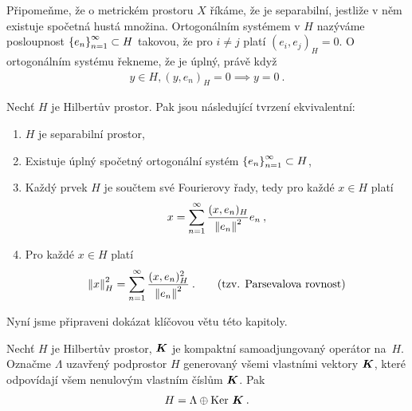 Připomeňme, že o metrickém prostoru $X$ říkáme, že je separabilní, jestliže v něm existuje spočetná hustá množina. Ortogonálním systémem v $H$ nazýváme posloupnost $\left \lbrace e_n \right \rbrace_{n=1}^\infty \subset H$ takovou, že pro $i\neq j$ platí $(e_i,e_j)_H =0$. O ortogonálním systému řekneme, že je úplný, právě když \begin{align*}
    y \in H, (y,e_n)_H =0 \implies y = 0 \:.
\end{align*}

\begin{theorem} \label{4.fourier}
Nechť $H$ je Hilbertův prostor. Pak jsou následující tvrzení ekvivalentní: \begin{enumerate}
    \item $H$ je separabilní prostor,
    \item Existuje úplný spočetný ortogonální systém $\left \lbrace e_n \right \rbrace_{n=1}^\infty \subset H$,
    \item Každý prvek $H$ je součtem své Fourierovy řady, tedy pro každé $x \in H$ platí \begin{align*}
        x = \sum_{n=1}^\infty \dfrac{(x,e_n)_H}{\left\lVert e_n\right\rVert^2} e_n \:,
    \end{align*}
    \item Pro každé $x \in H$ platí \begin{align*}
        \left\lVert x\right\rVert_H^2 = \sum_{n=1}^\infty \dfrac{(x,e_n)^2_H}{\left\lVert e_n\right\rVert^2} \:. \qquad \text{(tzv. Parsevalova rovnost)}
    \end{align*}
\end{enumerate}
\end{theorem}

Nyní jsme připraveni dokázat klíčovou větu této kapitoly.
\begin{theorem} \label{4.Hilbert-Schmidt}
Nechť $H$ je Hilbertův prostor, $\boldsymbol{K}$ je kompaktní samoadjungovaný operátor na~$H$. Označme $\Lambda$ uzavřený podprostor $H$ generovaný všemi vlastními vektory $\boldsymbol{K}$, které odpovídají všem nenulovým vlastním číslům $\boldsymbol{K}$. Pak \begin{align*}
    H = \Lambda \oplus \operatorname{Ker}\, \boldsymbol{K} \:.
\end{align*}
\end{theorem}


